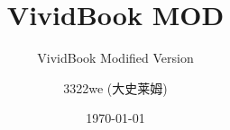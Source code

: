 
\usepackage{subfiles}
\usepackage{lipsum,zhlipsum}
\usepackage{Macros/Ebox}
\usepackage{Macros/Ecodecopy}
\usepackage{Macros/Eenum}
\usepackage{Macros/Efiguretable}

\title{VividBook MOD}
\subtitle{VividBook Modified Version}

\author{3322we (大史莱姆)}
\date{\today}




\newcommand{\displaynarrow}{%
    \setlength{\abovedisplayskip}{3pt}
    \setlength{\belowdisplayskip}{3pt}%
    }
\newcommand{\displaywide}{%
    \setlength{\abovedisplayskip}{6pt}
    \setlength{\belowdisplayskip}{6pt}%
    }

\setcounter{tocdepth}{2} %
\setcounter{secnumdepth}{1} %

\renewcommand{\emph}[1]{{\color{structurecolor}\bftitle#1}}
\newcommand{\fullemph}[1]{%
\colorbox{structurecolor!20}{#1}%
}

\allowdisplaybreaks

\usepackage{imakeidx}
\newcommand{\myindexheading}[1]{%
  \par\noindent\makebox[\linewidth][c]{%
    \color{structurecolor}\Large\bfseries #1%
  }\par\nopagebreak
}
\makeindex[options = -s indexstyle.ist]
